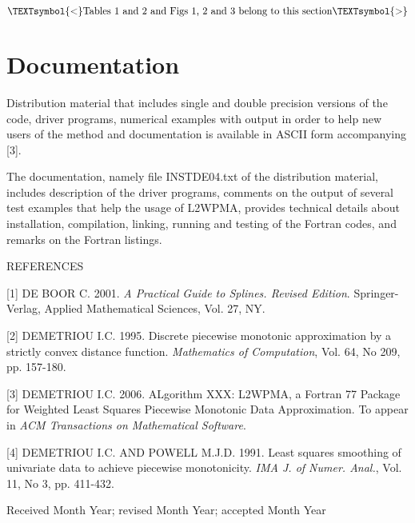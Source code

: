 \documentclass[acmtoms]{acmtrans2m}
\begin{document}
\[
\text{\TEXTsymbol{<}Tables 1 and 2 and Figs 1, 2 and 3 belong to this section%
\TEXTsymbol{>}}
\]

\section{Documentation}

Distribution material that includes single and double precision versions of
the code, driver programs, numerical examples with output in order to help
new users of the method and documentation is available in ASCII form
accompanying [3].

The documentation, namely file INSTDE04.txt of the distribution material,
includes description of the driver programs, comments on the output of
several test examples that help the usage of L2WPMA, provides technical
details about installation, compilation, linking, running and testing of the
Fortran codes, and remarks on the Fortran listings.\bigskip

\textsc{REFERENCES}

[1] DE BOOR C. 2001. \emph{A Practical Guide to Splines. Revised Edition}.
Springer-Verlag, Applied Mathematical Sciences, Vol. 27, NY.

[2] DEMETRIOU I.C. 1995. Discrete piecewise monotonic approximation by a
strictly convex distance function. \emph{Mathematics of Computation}, Vol.
64, No 209, pp. 157-180.

[3] DEMETRIOU I.C. 2006. ALgorithm XXX: L2WPMA, a Fortran 77 Package for
Weighted Least Squares Piecewise Monotonic Data Approximation. To appear in 
\emph{ACM Transactions on Mathematical Software}.

[4] DEMETRIOU I.C. AND POWELL M.J.D. 1991. Least squares smoothing of
univariate data to achieve piecewise monotonicity. \emph{IMA J. of Numer.
Anal.}, Vol. 11, No 3, pp. 411-432.

\begin{received}
Received Month Year; revised Month Year; accepted Month Year
\end{received}
\end{document}
